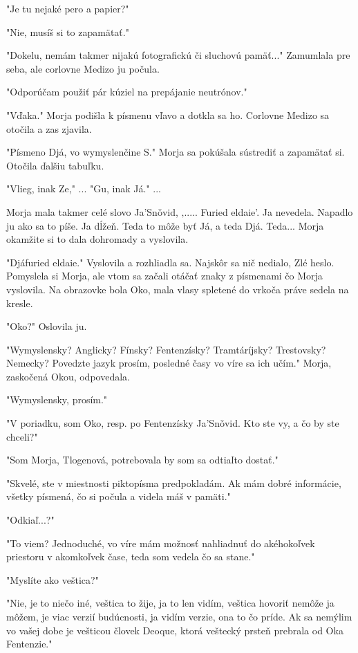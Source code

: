 \documentclass{book}
\begin{document}
"$ $Je tu nejaké pero a papier?"

"$ $Nie, musíš si to zapamätať."

"$ $Dokelu, nemám takmer nijakú fotografickú či sluchovú pamäť..."$ $ Zamumlala pre seba, ale corlovne Medizo ju počula.

"$ $Odporúčam použiť pár kúziel na prepájanie neutrónov."

"$ $Vďaka."$ $ Morja podišla k písmenu vľavo a dotkla sa ho. Corlovne Medizo sa otočila a zas zjavila.

"$ $Písmeno Djá, vo wymyslenčine S."$ $ Morja sa pokúšala sústrediť a zapamätať si. Otočila ďalšiu tabuľku.

"$ $Vlieg, inak Ze,"$ $ ... "$ $Gu, inak Já."$ $ ... 

Morja mala takmer celé slovo Ja'Sno\v{}vid, ‚..... Furied eldaie'. Ja nevedela. Napadlo ju ako sa to píše. Ja dĺžeň. Teda to môže byť Já, a teda Djá. Teda... Morja okamžite si to dala dohromady a vyslovila.

"$ $Djáfuried eldaie."$ $ Vyslovila a rozhliadla sa. Najskôr sa nič nedialo, Zlé heslo. Pomyslela si Morja, ale vtom sa začali otáčať znaky z písmenami čo Morja vyslovila. Na obrazovke bola Oko, mala vlasy spletené do vrkoča práve sedela na kresle.

"$ $Oko?"$ $ Oslovila ju. 

"$ $Wymyslensky? Anglicky? Fínsky? Fentenzísky? Tramtáríjsky? Trestovsky? Nemecky? Povedzte jazyk prosím, posledné časy vo víre sa ich učím."$ $ Morja, zaskočená Okou, odpovedala.

"$ $Wymyslensky, prosím."

"$ $V poriadku, som Oko, resp. po Fentenzísky Ja'Sno\v{}vid. Kto ste vy, a čo by ste chceli?"

"$ $Som Morja, Tlogenová, potrebovala by som sa odtiaľto dostať."

"$ $Skvelé, ste v miestnosti piktopísma predpokladám. Ak mám dobré informácie, všetky písmená, čo si počula a videla máš v pamäti."

"$ $Odkiaľ...?"

"$ $To viem? Jednoduché, vo víre mám možnosť nahliadnuť do akéhokoľvek priestoru v akomkoľvek čase, teda som vedela čo sa stane."

"$ $Myslíte ako veštica?"

"$ $Nie, je to niečo iné, veštica to žije, ja to len vidím, veštica hovoriť nemôže ja môžem, je viac verzií budúcnosti, ja vidím verzie, ona to čo príde. Ak sa nemýlim vo vašej dobe je vešticou človek Deoque, ktorá veštecký prsteň prebrala od Oka Fentenzie."
\end{document}
